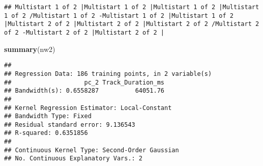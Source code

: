 \documentclass[
]{article}
\newenvironment{Shaded}{\begin{snugshade}}{\end{snugshade}}
\newcommand{\KeywordTok}[1]{\textcolor[rgb]{0.13,0.29,0.53}{\textbf{#1}}}
\newcommand{\NormalTok}[1]{#1}
\begin{document}
\begin{verbatim}
## Multistart 1 of 2 |Multistart 1 of 2 |Multistart 1 of 2 |Multistart 1 of 2 /Multistart 1 of 2 -Multistart 1 of 2 |Multistart 1 of 2 |Multistart 2 of 2 |Multistart 2 of 2 |Multistart 2 of 2 /Multistart 2 of 2 -Multistart 2 of 2 |Multistart 2 of 2 |                   
\end{verbatim}

\begin{Shaded}
\begin{Highlighting}[]
\KeywordTok{summary}\NormalTok{(nw2)}
\end{Highlighting}
\end{Shaded}

\begin{verbatim}
## 
## Regression Data: 186 training points, in 2 variable(s)
##                    pc_2 Track_Duration_ms
## Bandwidth(s): 0.6558287          64051.76
## 
## Kernel Regression Estimator: Local-Constant
## Bandwidth Type: Fixed
## Residual standard error: 9.136543
## R-squared: 0.6351856
## 
## Continuous Kernel Type: Second-Order Gaussian
## No. Continuous Explanatory Vars.: 2
\end{verbatim}
\end{document}
